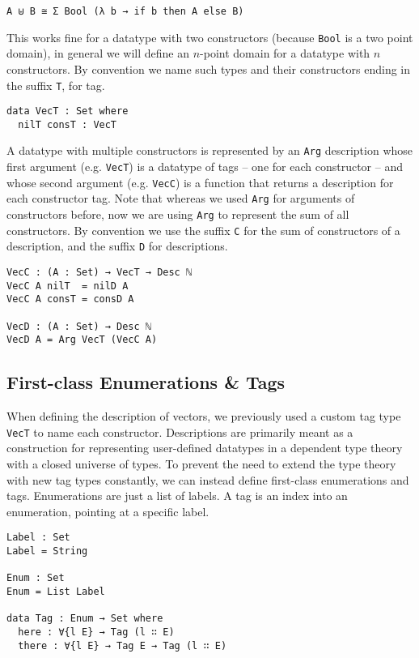 \documentclass[nonatbib]{sigplanconf}
\begin{document}
\begin{verbatim}
A ⊎ B ≅ Σ Bool (λ b → if b then A else B)
\end{verbatim}

This works fine for a datatype with two constructors (because {\tt Bool} is a two point domain),
in general we will define an $n$-point domain for a datatype with $n$ constructors. By
convention we name such types and their constructors ending in the suffix {\tt T}, for tag.

\begin{verbatim}
data VecT : Set where
  nilT consT : VecT
\end{verbatim}

A datatype with multiple constructors is represented by an
{\tt Arg} description whose first argument (e.g. {\tt VecT}) is a datatype of tags
-- one for each constructor -- and whose second argument (e.g. {\tt VecC}) is
a function that returns a description for each constructor tag. Note
that whereas we used {\tt Arg} for arguments of constructors before,
now we are using {\tt Arg} to represent the sum of all constructors.
By convention we use the suffix {\tt C} for the sum of constructors of
a description, and the suffix {\tt D} for descriptions.

\begin{verbatim}
VecC : (A : Set) → VecT → Desc ℕ
VecC A nilT  = nilD A
VecC A consT = consD A

VecD : (A : Set) → Desc ℕ
VecD A = Arg VecT (VecC A)
\end{verbatim}

\subsection{First-class Enumerations \& Tags}
\label{sec:background:case}

When defining the description of vectors, we previously used a custom
tag type {\tt VecT} to name each constructor. Descriptions are
primarily meant as a construction for representing user-defined
datatypes in a dependent type theory with a closed universe of types.
To prevent the need to extend the type theory with new tag types
constantly, we can instead define first-class enumerations and tags.
Enumerations are just a list of labels. A tag is an index into an
enumeration, pointing at a specific label.

\begin{verbatim}
Label : Set
Label = String

Enum : Set
Enum = List Label

data Tag : Enum → Set where
  here : ∀{l E} → Tag (l ∷ E)
  there : ∀{l E} → Tag E → Tag (l ∷ E)
\end{verbatim}
\end{document}
